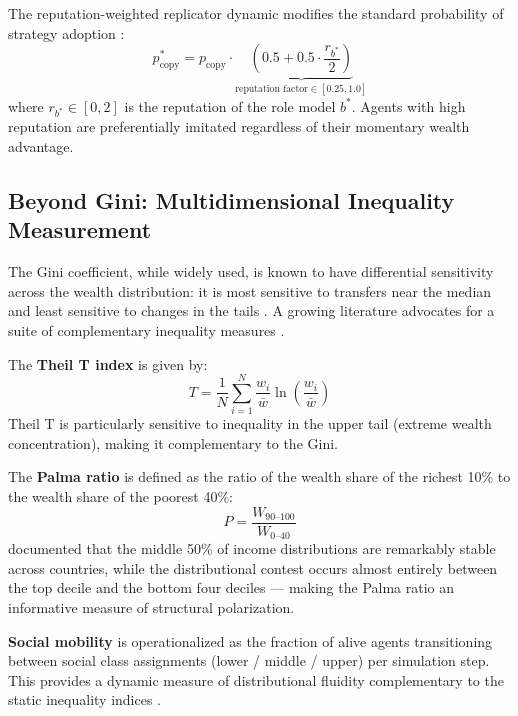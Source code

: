 \documentclass[12pt, letterpaper]{article}
\begin{document}
The reputation-weighted replicator dynamic modifies the standard
probability of strategy adoption \citep{schuster1983}:
\begin{equation}
  p_{\text{copy}}^* = p_{\text{copy}} \cdot
    \underbrace{\left(0.5 + 0.5 \cdot \frac{r_{b^*}}{2}\right)}_{
    \text{reputation factor} \in [0.25, 1.0]}
\end{equation}
where $r_{b^*} \in [0, 2]$ is the reputation of the role model $b^*$.
Agents with high reputation are preferentially imitated regardless of
their momentary wealth advantage.

\subsection{Beyond Gini: Multidimensional Inequality Measurement}

The Gini coefficient, while widely used, is known to have differential
sensitivity across the wealth distribution: it is most sensitive to
transfers near the median and least sensitive to changes in the tails
\citep{atkinson1970}. A growing literature advocates for a suite of
complementary inequality measures \citep{palma2011}.

The \textbf{Theil T index} \citep{theil1967} is given by:
\begin{equation}
  T = \frac{1}{N} \sum_{i=1}^{N} \frac{w_i}{\bar{w}}
    \ln\!\left(\frac{w_i}{\bar{w}}\right)
\end{equation}
Theil T is particularly sensitive to inequality in the upper tail
(extreme wealth concentration), making it complementary to the Gini.

The \textbf{Palma ratio} \citep{palma2011} is defined as the ratio of
the wealth share of the richest 10\% to the wealth share of the poorest
40\%:
\begin{equation}
  P = \frac{W_{90\text{--}100}}{W_{0\text{--}40}}
\end{equation}
\citet{palma2011} documented that the middle 50\% of income
distributions are remarkably stable across countries, while the
distributional contest occurs almost entirely between the top decile and
the bottom four deciles --- making the Palma ratio an informative
measure of structural polarization.

\textbf{Social mobility} is operationalized as the fraction of alive
agents transitioning between social class assignments (lower / middle /
upper) per simulation step. This provides a dynamic measure of
distributional fluidity complementary to the static inequality indices
\citep{chetty2014}.
\end{document}
